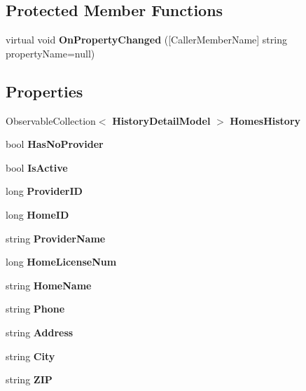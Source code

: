 \subsection*{Protected Member Functions}
\begin{DoxyCompactItemize}
\item 
virtual void \textbf{ On\+Property\+Changed} ([Caller\+Member\+Name] string property\+Name=null)
\end{DoxyCompactItemize}
\subsection*{Properties}
\begin{DoxyCompactItemize}
\item 
Observable\+Collection$<$ \textbf{ History\+Detail\+Model} $>$ \textbf{ Homes\+History}\hspace{0.3cm}{\ttfamily  [get, set]}
\item 
bool \textbf{ Has\+No\+Provider}\hspace{0.3cm}{\ttfamily  [get, set]}
\item 
bool \textbf{ Is\+Active}\hspace{0.3cm}{\ttfamily  [get, set]}
\item 
long \textbf{ Provider\+ID}\hspace{0.3cm}{\ttfamily  [get, set]}
\item 
long \textbf{ Home\+ID}\hspace{0.3cm}{\ttfamily  [get, set]}
\item 
string \textbf{ Provider\+Name}\hspace{0.3cm}{\ttfamily  [get, set]}
\item 
long \textbf{ Home\+License\+Num}\hspace{0.3cm}{\ttfamily  [get, set]}
\item 
string \textbf{ Home\+Name}\hspace{0.3cm}{\ttfamily  [get, set]}
\item 
string \textbf{ Phone}\hspace{0.3cm}{\ttfamily  [get, set]}
\item 
string \textbf{ Address}\hspace{0.3cm}{\ttfamily  [get, set]}
\item 
string \textbf{ City}\hspace{0.3cm}{\ttfamily  [get, set]}
\item 
string \textbf{ Z\+IP}\hspace{0.3cm}{\ttfamily  [get, set]}

\end{DoxyCompactItemize}
